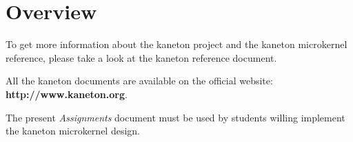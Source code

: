 %
%

\section{Overview}

To get more information about the kaneton project and the kaneton
microkernel reference, please take a look at the kaneton reference
document.

All the kaneton documents are available on the official website:
\textbf{http://www.kaneton.org}.

The present \textit{Assignments} document must be used by students
willing implement the kaneton microkernel design.












